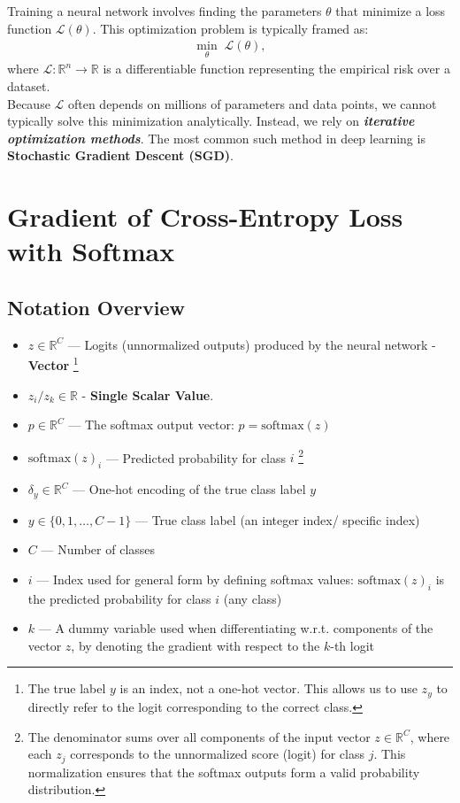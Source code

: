 Training a neural network involves finding the parameters $\theta$ that minimize a loss function $\mathcal{L}(\theta)$. This optimization problem is typically framed as:
\begin{align}
	\min_{\theta} \; \mathcal{L}(\theta),
\end{align}
where $\mathcal{L} : \mathbb{R}^n \rightarrow \mathbb{R}$ is a differentiable function representing the empirical risk over a dataset.\\

Because $\mathcal{L}$ often depends on millions of parameters and data points, we cannot typically solve this minimization analytically. Instead, we rely on  \textit{\textbf{iterative optimization methods}}. The most common such method in deep learning is \textbf{Stochastic Gradient Descent (SGD)}.


\section*{Gradient of Cross-Entropy Loss with Softmax}

\subsection*{Notation Overview}
\begin{itemize}
    \item $z \in \mathbb{R}^C$ — Logits (unnormalized outputs) produced by the neural network - \textbf{Vector}
\footnote{The true label $y$ is an index, not a one-hot vector. This allows us to use $z_y$ to directly refer to the logit corresponding to the correct class.}
	\item $z_i / z_k \in \mathbb{R}$ - \textbf{Single Scalar Value}.
    \item $p \in \mathbb{R}^C$ — The softmax output vector: $p = \text{softmax}(z)$
    \item $\text{softmax}(z)_i$ — Predicted probability for class $i$ \footnote{The denominator sums over all components of the input vector $z \in \mathbb{R}^C$, where each $z_j$ corresponds to the unnormalized score (logit) for class $j$. This normalization ensures that the softmax outputs form a valid probability distribution.}
    \item $\delta_y \in \mathbb{R}^C$ — One-hot encoding of the true class label $y$
   \item $y \in \{0, 1, \dots, C-1\}$ — True class label (an integer index/ specific index)
   \item $C$ — Number of classes
   \item $i$ — Index used for general form by defining softmax values: $\text{softmax}(z)_i$ is the predicted probability for class $i$ (any class)
    \item $k$ — A dummy variable used when differentiating w.r.t. components of the vector $z$, by denoting the gradient with respect to the $k$-th logit
\end{itemize}

